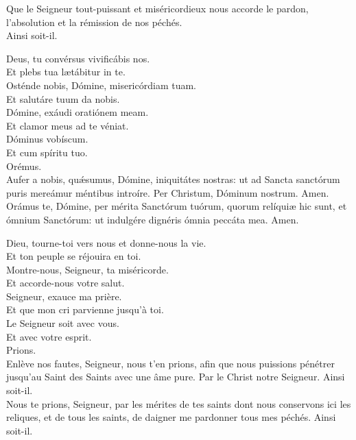 \documentclass[twoside]{article}
\begin{document}
\vv Que le Seigneur tout-puissant et miséricordieux nous accorde le pardon, l’absolution et la rémission de nos péchés.\\
\rr Ainsi soit-il.

\begin{paracol}{2}

\vv Deus, tu convérsus vivificábis nos.\\
\rr Et plebs tua lætábitur in te.\\
\vv Osténde nobis, Dómine, misericórdiam tuam.\\
\rr Et salutáre tuum da nobis.\\
\vv Dómine, exáudi oratiónem meam.\\
\rr Et clamor meus ad te véniat.\\
\vv Dóminus vobíscum.\\
\rr Et cum spíritu tuo.\\
\vv Orémus. \\
Aufer a nobis, quǽsumus, Dómine, iniquitátes nostras: ut ad Sancta sanctórum puris mereámur méntibus introíre. Per Christum, Dóminum nostrum. Amen.\\
Orámus te, Dómine, per mérita Sanctórum tuórum, quorum relíquiæ hic sunt, et ómnium Sanctórum: ut indulgére dignéris ómnia peccáta mea. Amen.

\switchcolumn

\vv Dieu, tourne-toi vers nous et donne-nous la vie.\\
\rr Et ton peuple se réjouira en toi.\\
\vv Montre-nous, Seigneur, ta miséricorde.\\
\rr Et accorde-nous votre salut.\\
\vv Seigneur, exauce ma prière.\\
\rr Et que mon cri parvienne jusqu’à toi.\\
\vv Le Seigneur soit avec vous.\\
\rr Et avec votre esprit.\\
\vv Prions. \\
Enlève nos fautes, Seigneur, nous t'en prions, aﬁn que nous puissions pénétrer jusqu’au Saint des Saints avec une âme pure. Par le Christ notre Seigneur. Ainsi soit-il.\\
Nous te prions, Seigneur, par les mérites de tes saints dont nous conservons ici les reliques, et de tous les saints, de daigner me pardonner tous mes péchés. Ainsi soit-il.

\end{paracol}
\end{document}
